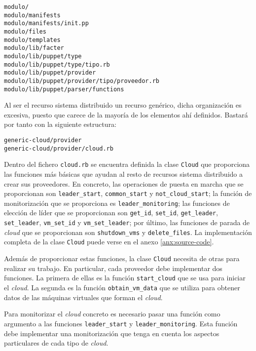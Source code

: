 \begin{lstlisting}
modulo/
modulo/manifests
modulo/manifests/init.pp
modulo/files
modulo/templates
modulo/lib/facter
modulo/lib/puppet/type
modulo/lib/puppet/type/tipo.rb
modulo/lib/puppet/provider
modulo/lib/puppet/provider/tipo/proveedor.rb
modulo/lib/puppet/parser/functions
\end{lstlisting}

Al ser el recurso sistema distribuido un recurso genérico, dicha organización es excesiva, puesto que carece de la mayoría de los elementos ahí definidos. Bastará por tanto con la siguiente estructura:

\begin{lstlisting}
generic-cloud/provider
generic-cloud/provider/cloud.rb
\end{lstlisting}

Dentro del fichero \texttt{cloud.rb} se encuentra definida la clase \texttt{Cloud} que proporciona las funciones más básicas que ayudan al resto de recursos sistema distribuido a crear sus proveedores. En concreto, las operaciones de puesta en marcha que se proporcionan son \texttt{leader\_start}, \texttt{common\_start} y \texttt{not\_cloud\_start}; la función de monitorización que se proporciona es \texttt{leader\_monitoring}; las funciones de elección de líder que se proporcionan son \texttt{get\_id}, \texttt{set\_id}, \texttt{get\_leader}, \texttt{set\_leader}, \texttt{vm\_set\_id} y \texttt{vm\_set\_leader}; por último, las funciones de parada de \emph{cloud} que se proporcionan son \texttt{shutdown\_vms} y \texttt{delete\_files}. La implementación completa de la clase \texttt{Cloud} puede verse en el anexo \ref{anx:source-code}.

Además de proporcionar estas funciones, la clase \texttt{Cloud} necesita de otras para realizar su trabajo. En particular, cada proveedor debe implementar dos funciones. La primera de ellas es la función \texttt{start\_cloud} que se usa para iniciar el \emph{cloud}. La segunda es la función \texttt{obtain\_vm\_data} que se utiliza para obtener datos de las máquinas virtuales que forman el \emph{cloud}.

Para monitorizar el \emph{cloud} concreto es necesario pasar una función como argumento a las funciones \texttt{leader\_start} y \texttt{leader\_monitoring}. Esta función debe implementar una monitorización que tenga en cuenta los aspectos particulares de cada tipo de \emph{cloud}.


